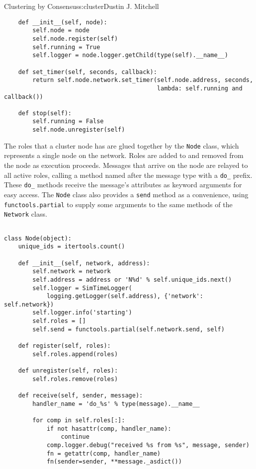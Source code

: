 \begin{aosachapter}{Clustering by Consensus}{s:cluster}{Dustin J. Mitchell}
\begin{verbatim}
    def __init__(self, node):
        self.node = node
        self.node.register(self)
        self.running = True
        self.logger = node.logger.getChild(type(self).__name__)

    def set_timer(self, seconds, callback):
        return self.node.network.set_timer(self.node.address, seconds,
                                           lambda: self.running and callback())

    def stop(self):
        self.running = False
        self.node.unregister(self)
\end{verbatim}

The roles that a cluster node has are glued together by the
\texttt{Node} class, which represents a single node on the network.
Roles are added to and removed from the node as execution proceeds.
Messages that arrive on the node are relayed to all active roles,
calling a method named after the message type with a \texttt{do\_}
prefix. These \texttt{do\_} methods receive the message's attributes as
keyword arguments for easy access. The \texttt{Node} class also provides
a \texttt{send} method as a convenience, using
\texttt{functools.partial} to supply some arguments to the same methods
of the \texttt{Network} class.

\begin{verbatim}

class Node(object):
    unique_ids = itertools.count()

    def __init__(self, network, address):
        self.network = network
        self.address = address or 'N%d' % self.unique_ids.next()
        self.logger = SimTimeLogger(
            logging.getLogger(self.address), {'network': self.network})
        self.logger.info('starting')
        self.roles = []
        self.send = functools.partial(self.network.send, self)

    def register(self, roles):
        self.roles.append(roles)

    def unregister(self, roles):
        self.roles.remove(roles)

    def receive(self, sender, message):
        handler_name = 'do_%s' % type(message).__name__

        for comp in self.roles[:]:
            if not hasattr(comp, handler_name):
                continue
            comp.logger.debug("received %s from %s", message, sender)
            fn = getattr(comp, handler_name)
            fn(sender=sender, **message._asdict())
    
\end{verbatim}


\end{aosachapter}

